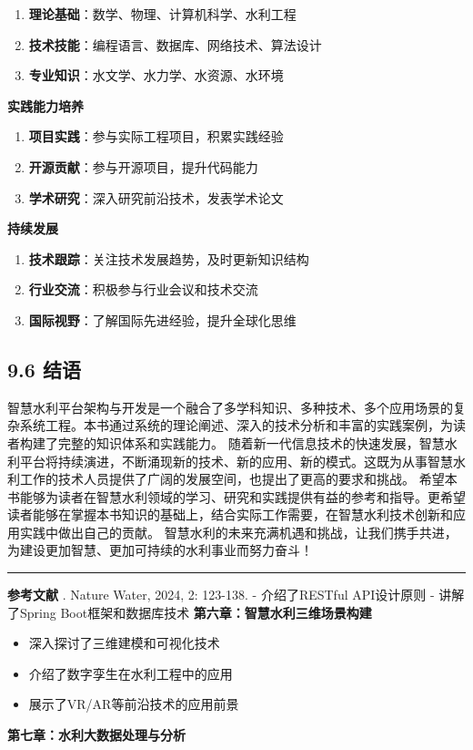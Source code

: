 \begin{enumerate} \def\labelenumi{\arabic{enumi}.} \tightlist \item \textbf{理论基础}：数学、物理、计算机科学、水利工程 \item
\textbf{技术技能}：编程语言、数据库、网络技术、算法设计 \item \textbf{专业知识}：水文学、水力学、水资源、水环境 \end{enumerate} \textbf{实践能力培养} \begin{enumerate}
\def\labelenumi{\arabic{enumi}.} \tightlist \item \textbf{项目实践}：参与实际工程项目，积累实践经验 \item \textbf{开源贡献}：参与开源项目，提升代码能力 \item
\textbf{学术研究}：深入研究前沿技术，发表学术论文 \end{enumerate} \textbf{持续发展} \begin{enumerate} \def\labelenumi{\arabic{enumi}.}
\tightlist \item \textbf{技术跟踪}：关注技术发展趋势，及时更新知识结构 \item \textbf{行业交流}：积极参与行业会议和技术交流 \item \textbf{国际视野}：了解国际先进经验，提升全球化思维
\end{enumerate} \subsection{9.6 结语}\label{ux7ed3ux8bed}
智慧水利平台架构与开发是一个融合了多学科知识、多种技术、多个应用场景的复杂系统工程。本书通过系统的理论阐述、深入的技术分析和丰富的实践案例，为读者构建了完整的知识体系和实践能力。
随着新一代信息技术的快速发展，智慧水利平台将持续演进，不断涌现新的技术、新的应用、新的模式。这既为从事智慧水利工作的技术人员提供了广阔的发展空间，也提出了更高的要求和挑战。
希望本书能够为读者在智慧水利领域的学习、研究和实践提供有益的参考和指导。更希望读者能够在掌握本书知识的基础上，结合实际工作需要，在智慧水利技术创新和应用实践中做出自己的贡献。
智慧水利的未来充满机遇和挑战，让我们携手共进，为建设更加智慧、更加可持续的水利事业而努力奋斗！ \begin{center}\rule{0.5\linewidth}{0.5pt}\end{center} \textbf{参考文献} .
Nature Water, 2024, 2: 123-138. - 介绍了RESTful API设计原则 - 讲解了Spring Boot框架和数据库技术 \textbf{第六章：智慧水利三维场景构建} \begin{itemize}
\tightlist \item 深入探讨了三维建模和可视化技术 \item 介绍了数字孪生在水利工程中的应用 \item 展示了VR/AR等前沿技术的应用前景 \end{itemize} \textbf{第七章：水利大数据处理与分析}
